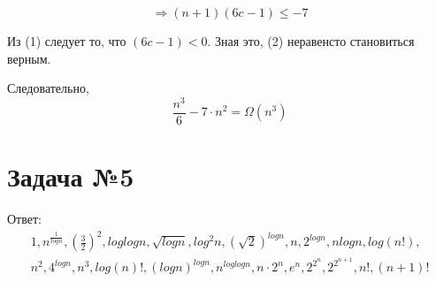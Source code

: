\documentclass{article}
\begin{document}
\begin{equation}
    \Rightarrow
    (n+1)(6c-1) \leq -7
\end{equation}

Из (1) следует то, что $(6c - 1) < 0$. Зная это, (2) неравенсто становиться верным.

Следовательно, 
\begin{equation*}
    \frac{n^3}{6} - 7\cdot n^2 = \Omega(n^3)
\end{equation*}

\section{Задача №5}
    Ответ: 
    \begin{align*}
        1,n^{\frac{1}{logn}}, (\frac{3}{2})^2, loglogn, \sqrt{logn}, log^2n, (\sqrt{2})^{logn}, n, 2^{logn}, nlogn, log(n!),\\
        n^2, 4^{logn}, n^3, log(n)!, (logn)^{logn}, n^{loglogn}, n\cdot 2^n ,e^n, 2^{2^n}, 2^{2^{n + 1}},  n!, (n+1)!
    \end{align*}
\end{document}
